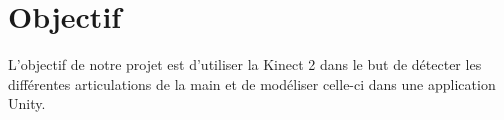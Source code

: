 \chapter{Objectif}
L'objectif de notre projet est d'utiliser la Kinect 2 dans le but de détecter les différentes articulations
de la main et de modéliser celle-ci dans une application Unity.

